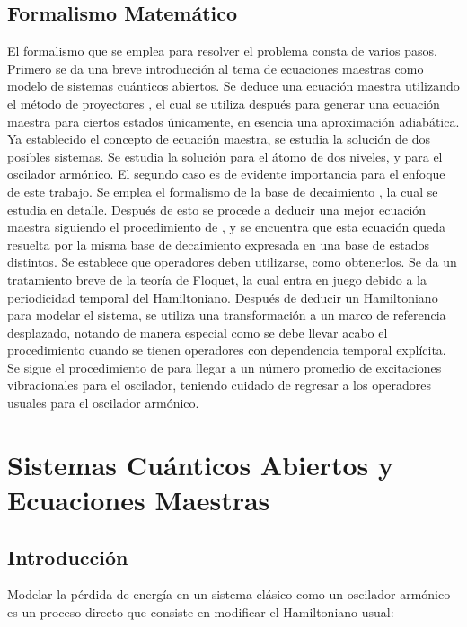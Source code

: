 \documentclass[a4paper,10pt]{report}
\begin{document}
\section{Formalismo Matemático}

El formalismo que se emplea para resolver el problema consta de varios pasos. Primero se da una breve introducción al tema de ecuaciones maestras como modelo de sistemas cuánticos abiertos. Se deduce una ecuación maestra utilizando el método de proyectores \cite{ZollerQN}, el cual se utiliza después para generar una ecuación maestra para ciertos estados únicamente, en esencia una aproximación adiabática. Ya establecido el concepto de ecuación maestra, se estudia la solución de dos posibles sistemas. Se estudia la solución para el átomo de dos niveles, y para el oscilador armónico. El segundo caso es de evidente importancia para el enfoque de este trabajo. Se emplea el formalismo de la base de decaimiento \cite{EnglertDB}, la cual se estudia en detalle. Después de esto se procede a deducir una mejor ecuación maestra siguiendo el procedimiento de \cite{HanngiFM}, y se encuentra que esta ecuación queda resuelta por la misma base de decaimiento expresada en una base de estados distintos. Se establece que operadores deben utilizarse, como obtenerlos. Se da un tratamiento breve de la teoría de Floquet, la cual entra en juego debido a la periodicidad temporal del Hamiltoniano. Después de deducir un Hamiltoniano para modelar el sistema, se utiliza una transformación a un marco de referencia desplazado, notando de manera especial como se debe llevar acabo el procedimiento cuando se tienen operadores con dependencia temporal explícita. Se sigue el procedimiento de \cite{BarberisLC} para llegar a un número promedio de excitaciones vibracionales para el oscilador, teniendo cuidado de regresar a los operadores usuales para el oscilador armónico. 


\chapter{Sistemas Cuánticos Abiertos y Ecuaciones Maestras}

\section{Introducción}

Modelar la pérdida de energía en un sistema clásico como un oscilador armónico es un proceso directo \cite{CarmichaelQO} que consiste en modificar el Hamiltoniano usual:
\end{document}
